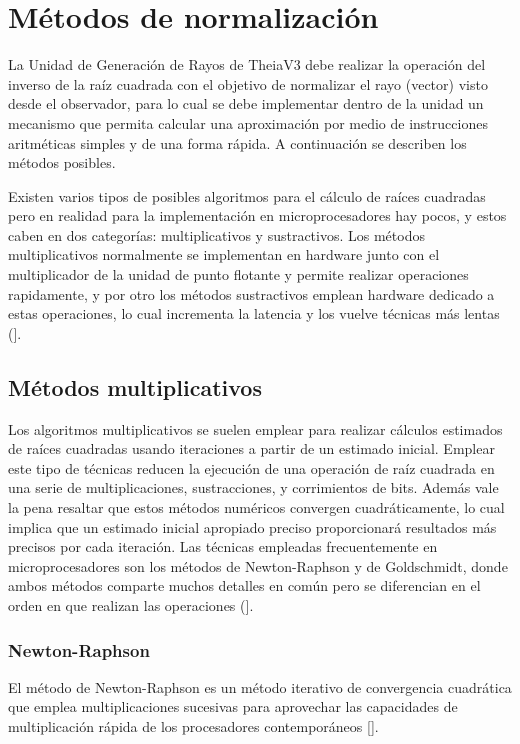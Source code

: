 \section{Métodos de normalización}

La Unidad de Generación de Rayos de TheiaV3 debe realizar la operación del inverso de la raíz cuadrada con el objetivo de normalizar el rayo (vector) visto desde el observador, para lo cual se debe implementar dentro de
la unidad un mecanismo que permita calcular una aproximación por medio de instrucciones aritméticas simples y de una forma rápida.  A continuación se describen los métodos posibles. 

Existen varios tipos de posibles algoritmos para el cálculo de raíces cuadradas pero en realidad para la implementación en microprocesadores hay pocos, y estos caben en dos categorías: multiplicativos y sustractivos. Los métodos multiplicativos normalmente se implementan en hardware junto con el multiplicador de la unidad de punto flotante y permite realizar operaciones rapidamente, y por otro los métodos sustractivos emplean hardware dedicado a estas operaciones, lo cual incrementa la latencia y los vuelve técnicas más lentas (\cite{Soderquist1997}].   

\subsection{Métodos multiplicativos}

Los algoritmos multiplicativos se suelen emplear para realizar cálculos estimados de raíces cuadradas usando iteraciones a partir de un estimado inicial. Emplear este tipo de técnicas reducen la ejecución de una operación de raíz cuadrada en una serie de multiplicaciones, sustracciones, y corrimientos de bits. Además vale la pena resaltar que estos métodos numéricos convergen cuadráticamente, lo cual implica que un estimado inicial apropiado preciso proporcionará resultados más precisos por cada iteración. Las técnicas empleadas frecuentemente en microprocesadores son los métodos de Newton-Raphson y de Goldschmidt, donde ambos métodos comparte muchos detalles en común pero se diferencian en el orden en que realizan las operaciones (\cite{Soderquist1997}].

\subsubsection{Newton-Raphson}

El método de Newton-Raphson es un método iterativo de convergencia cuadrática que emplea multiplicaciones sucesivas para aprovechar las capacidades de multiplicación rápida de los procesadores contemporáneos [\cite{Schulte1999}]. 

